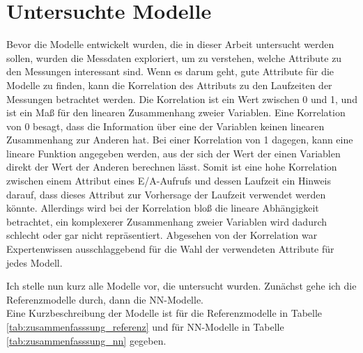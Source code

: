 \documentclass[
	twoside,
	12pt,
	a4paper,
	BCOR10mm,
	DIV14,
	listof=totoc,
	bibliography=totoc,
	headsepline
]{scrreprt}
\begin{document}
\section{Untersuchte Modelle}
\label{analyse:modelle}
Bevor die Modelle entwickelt wurden, die in dieser Arbeit untersucht werden sollen, wurden die Messdaten exploriert, um zu verstehen, welche Attribute zu den Messungen interessant sind.
Wenn es darum geht, gute Attribute für die Modelle zu finden, kann die Korrelation des Attributs zu den Laufzeiten der Messungen betrachtet werden.
Die Korrelation ist ein Wert zwischen 0 und 1, und ist ein Maß für den linearen Zusammenhang zweier Variablen. Eine Korrelation von 0 besagt, dass die Information über eine der Variablen keinen linearen Zusammenhang zur Anderen hat.
Bei einer Korrelation von 1 dagegen, kann eine lineare Funktion angegeben werden, aus der sich der Wert der einen Variablen direkt der Wert der Anderen berechnen lässt. Somit ist eine hohe Korrelation zwischen einem Attribut eines E/A-Aufrufs und dessen Laufzeit ein Hinweis darauf, dass dieses Attribut zur Vorhersage der Laufzeit verwendet werden könnte. 
Allerdings wird bei der Korrelation bloß die lineare Abhängigkeit betrachtet, ein komplexerer Zusammenhang zweier Variablen wird dadurch schlecht oder gar nicht repräsentiert.
Abgesehen von der Korrelation war Expertenwissen ausschlaggebend für die Wahl der verwendeten Attribute für jedes Modell.

Ich stelle nun kurz alle Modelle vor, die untersucht wurden. Zunächst gehe ich die Referenzmodelle durch, dann die NN-Modelle.\\
Eine Kurzbeschreibung der Modelle ist für die Referenzmodelle in Tabelle \ref{tab:zusammenfasssung_referenz} und für NN-Modelle in Tabelle \ref{tab:zusammenfasssung_nn} gegeben.
\end{document}
